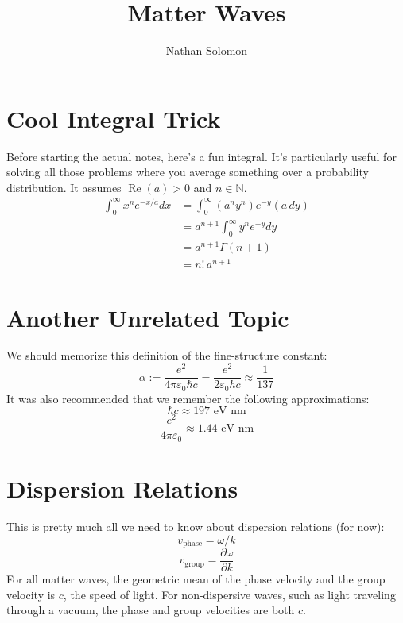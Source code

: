 \documentclass[12pt]{article}
\begin{document}
\title{Matter Waves}
\author{Nathan Solomon}
\maketitle

\section{Cool Integral Trick}
Before starting the actual notes, here's a fun integral. It's particularly useful for solving all those problems where you average something over a probability distribution. It assumes $\operatorname{Re}(a)>0$ and $n \in \mathbb{N}$.
\begin{align*}
    \int_0^\infty x^n e^{-x/a} dx &= \int_0^\infty (a^n y^n) e^{-y} (a \, dy) \\
    &= a^{n+1} \int_0^\infty y^n e^{-y} dy \\
    &= a^{n+1} \Gamma(n+1) \\
    &= n! \, a^{n+1}
\end{align*}

\section{Another Unrelated Topic}
We should memorize this definition of the fine-structure constant:
\[ \alpha := \frac{e^2}{4 \pi \varepsilon_0 \hbar c} = \frac{e^2}{2 \varepsilon_0 h c} \approx \frac{1}{137} \]
It was also recommended that we remember the following approximations:
\[ \hbar c \approx 197 \text{ eV nm} \]
\[ \frac{e^2}{4 \pi \varepsilon_0} \approx 1.44 \text{ eV nm} \]

\section{Dispersion Relations}
This is pretty much all we need to know about dispersion relations (for now):
\[ v_\text{phase} = \omega / k \]
\[ v_\text{group} = \frac{\partial \omega}{\partial k} \]
For all matter waves, the geometric mean of the phase velocity and the group velocity is $c$, the speed of light. For non-dispersive waves, such as light traveling through a vacuum, the phase and group velocities are both $c$.
\end{document}
